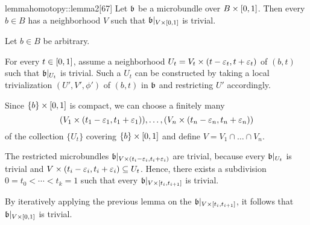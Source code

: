 \begin{mystatement}{lemma}{homotopy::lemma2}[67]
    Let $\bb$ be a microbundle over $B \times{} [0, 1]$.
    Then every $b \in B$ has a neighborhood $V$ such that $\bb[\cyl{V}]$ is trivial.
\end{mystatement}

\begin{myproof}
    Let $b \in B$ be arbitrary.

    For every $t \in [0, 1]$, assume a neighborhood
    $U_t = V_t \times (t - \varepsilon{}_t, t + \varepsilon{}_t)$ of $(b, t)$
    such that $\bb[U_t]$ is trivial.
    Such a $U_t$ can be constructed by taking
    a local trivialization $(U', V', \phi')$ of $(b, t)$ in $\bb$
    and restricting $U'$ accordingly.

    Since $\{b\} \times{} [0, 1]$ is compact, we can choose a finitely many
    \[ (V_1 \times (t_1 - \varepsilon{}_1, t_1 + \varepsilon{}_1)), \dots, (V_n \times (t_n - \varepsilon{}_n, t_n + \varepsilon{}_n)) \]
    of the collection $\{U_t\}$ covering $\{b\} \times [0, 1]$ and define $V = V_1 \cap \dots \cap V_n$.

    The restricted microbundles $\bb[V \cross (t_i - \eps_i, t_i + \eps_i)]$ are trivial, because every $\bb[U_t]$ is trivial and $V \times (t_i - \varepsilon{}_i, t_i + \varepsilon{}_i) \subseteq{} U_t$.
    Hence, there exists a subdivision $0 = t_0 < \cdots < t_k = 1$ such that every $\bb[V \cross [t_{i}, t_{i + 1}]]$ is trivial.
    
    By iteratively applying the previous lemma on the $\bb[V \cross [t_i, t_{i + 1}]]$, it follows that $\bb[\cyl{V}]$ is trivial.
\end{myproof}